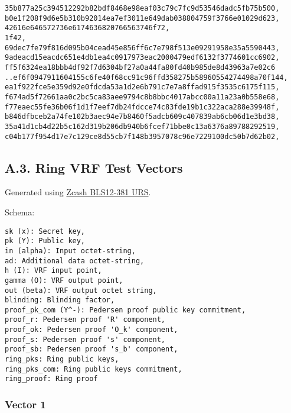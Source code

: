 \documentclass[
]{article}
\begin{document}
\begin{verbatim}
35b877a25c394512292b82bdf8468e98eaf03c79c7fc9d53546dadc5fb75b500,
b0e1f208f9d6e5b310b92014ea7ef3011e649dab038804759f3766e01029d623,
42616e646572736e6174636820766563746f72,
1f42,
69dec7fe79f816d095b04cead45e856ff6c7e798f513e09291958e35a5590443,
9adeacd15eacdc651e4db1ea4c0917973eac2000479edf6132f3774601cc6902,
ff5f6324ea18bbb4df92f7d6304bf27a0a44fa80fd40b985de8d43963a7e02c6
..ef6f0947911604155c6fe40f68cc91c96ffd358275b58960554274498a70f144,
ea1f922fce5e359d92e0fdcda53a1d2e6b791c7e7a8ffad915f3535c6175f115,
f674ad5f72661aa0c2bc5ca83aee9794c8b8bbc4017abcc00a11a23a0b558e68,
f77eaec55fe36b06f1d1f7eef7db24fdcce74c83fde19b1c322aca288e39948f,
b846dfbceb2a74fe102b3aec94e7b8460f5adcb609c407839ab6cb06d1e3bd38,
35a41d1cb4d22b5c162d319b206db940b6fcef71bbe0c13a6376a89788292519,
c04b177f954d17e7c129ce8d55cb7f148b3957078c96e7229100dc50b7d62b02,
\end{verbatim}

\hypertarget{a.3.-ring-vrf-test-vectors}{%
\subsection{A.3. Ring VRF Test
Vectors}\label{a.3.-ring-vrf-test-vectors}}

Generated using
\href{https://zfnd.org/conclusion-of-the-powers-of-tau-ceremony}{Zcash
BLS12-381 URS}.

Schema:

\begin{verbatim}
sk (x): Secret key,
pk (Y): Public key,
in (alpha): Input octet-string,
ad: Additional data octet-string,
h (I): VRF input point,
gamma (O): VRF output point,
out (beta): VRF output octet string,
blinding: Blinding factor,
proof_pk_com (Y^-): Pedersen proof public key commitment,
proof_r: Pedersen proof 'R' component,
proof_ok: Pedersen proof 'O_k' component,
proof_s: Pedersen proof 's' component,
proof_sb: Pedersen proof 's_b' component,
ring_pks: Ring public keys,
ring_pks_com: Ring public keys commitment,
ring_proof: Ring proof
\end{verbatim}

\hypertarget{vector-1-2}{%
\subsubsection{Vector 1}\label{vector-1-2}}
\end{document}
